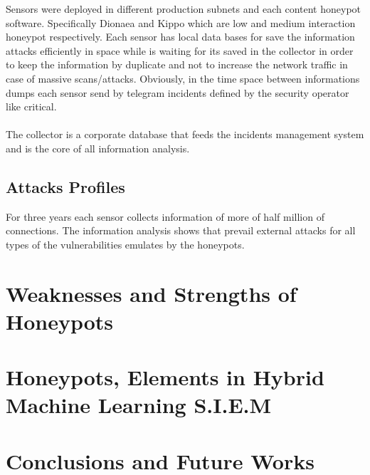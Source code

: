\documentclass[a4paper]{llncs}
\begin{document}
Sensors were deployed in different production subnets and each content honeypot software. Specifically Dionaea and Kippo which are low and medium interaction honeypot respectively. Each sensor has local data bases for save the information attacks efficiently in space while is waiting for its saved in the collector in order to keep the information by duplicate and not to increase the network traffic in case of massive scans/attacks. Obviously, in the time space between informations dumps each sensor send by telegram incidents  defined by the security operator like critical.\\\\The collector is a corporate database that feeds the incidents management system and is the core of all information analysis.


\subsection{Attacks Profiles}

For three years each sensor collects information of more of half million of connections. The information analysis shows that prevail external attacks for all types of the vulnerabilities emulates by the honeypots.


\section{Weaknesses and Strengths of Honeypots}

\section{Honeypots, Elements in Hybrid Machine Learning S.I.E.M}

\section{Conclusions and Future Works}
\end{document}
